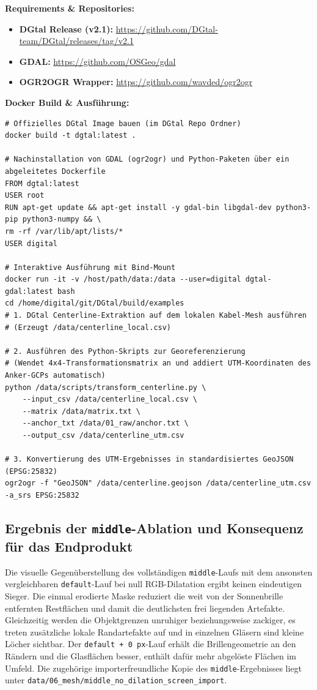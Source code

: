 \documentclass[12pt,a4paper]{article}
\begin{document}
\textbf{Requirements \& Repositories:}
\begin{itemize}[noitemsep]
    \item \textbf{DGtal Release (v2.1):} \url{https://github.com/DGtal-team/DGtal/releases/tag/v2.1}
    \item \textbf{GDAL:} \url{https://github.com/OSGeo/gdal}
    \item \textbf{OGR2OGR Wrapper:} \url{https://github.com/wavded/ogr2ogr}
\end{itemize}

\textbf{Docker Build \& Ausführung:}
\begin{verbatim}
# Offizielles DGtal Image bauen (im DGtal Repo Ordner)
docker build -t dgtal:latest .

# Nachinstallation von GDAL (ogr2ogr) und Python-Paketen über ein abgeleitetes Dockerfile
FROM dgtal:latest
USER root
RUN apt-get update && apt-get install -y gdal-bin libgdal-dev python3-pip python3-numpy && \
rm -rf /var/lib/apt/lists/*
USER digital

# Interaktive Ausführung mit Bind-Mount
docker run -it -v /host/path/data:/data --user=digital dgtal-gdal:latest bash
cd /home/digital/git/DGtal/build/examples
# 1. DGtal Centerline-Extraktion auf dem lokalen Kabel-Mesh ausführen
# (Erzeugt /data/centerline_local.csv)

# 2. Ausführen des Python-Skripts zur Georeferenzierung
# (Wendet 4x4-Transformationsmatrix an und addiert UTM-Koordinaten des Anker-GCPs automatisch)
python /data/scripts/transform_centerline.py \
    --input_csv /data/centerline_local.csv \
    --matrix /data/matrix.txt \
    --anchor_txt /data/01_raw/anchor.txt \
    --output_csv /data/centerline_utm.csv

# 3. Konvertierung des UTM-Ergebnisses in standardisiertes GeoJSON (EPSG:25832)
ogr2ogr -f "GeoJSON" /data/centerline.geojson /data/centerline_utm.csv -a_srs EPSG:25832
\end{verbatim}

\subsection*{Ergebnis der \texttt{middle}-Ablation und Konsequenz für das Endprodukt}

Die visuelle Gegenüberstellung des vollständigen \texttt{middle}-Laufs mit dem ansonsten vergleichbaren \texttt{default}-Lauf bei null RGB-Dilatation ergibt keinen eindeutigen Sieger. Die einmal erodierte Maske reduziert die weit von der Sonnenbrille entfernten Restflächen und damit die deutlichsten frei liegenden Artefakte. Gleichzeitig werden die Objektgrenzen unruhiger beziehungsweise zackiger, es treten zusätzliche lokale Randartefakte auf und in einzelnen Gläsern sind kleine Löcher sichtbar. Der \texttt{default + 0\,px}-Lauf erhält die Brillengeometrie an den Rändern und die Glasflächen besser, enthält dafür mehr abgelöste Flächen im Umfeld. Die zugehörige importerfreundliche Kopie des \texttt{middle}-Ergebnisses liegt unter \texttt{data/06\_mesh/middle\_no\_dilation\_screen\_import}.
\end{document}
